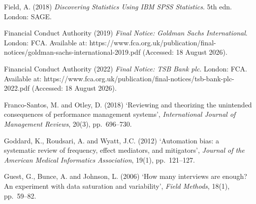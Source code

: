 \documentclass[11pt,a4paper]{article}
\numberwithin{figure}{section}
\numberwithin{table}{section}
\begin{document}
{\noindent\hypertarget{ref25}{}\begin{minipage}[t]{\dimexpr\linewidth-1.05cm\relax}Field, A. (2018) \emph{Discovering Statistics Using IBM SPSS Statistics}. 5th edn. London: SAGE.\end{minipage}\par\vspace{4pt}
\noindent\hypertarget{ref26}{}\begin{minipage}[t]{\dimexpr\linewidth-1.05cm\relax}Financial Conduct Authority (2019) \emph{Final Notice: Goldman Sachs International}. London: FCA. Available at: https://www.fca.org.uk/publication/final-notices/goldman-sachs-international-2019.pdf (Accessed: 18 August 2026).\end{minipage}\par\vspace{4pt}
\noindent\hypertarget{ref27}{}\begin{minipage}[t]{\dimexpr\linewidth-1.05cm\relax}Financial Conduct Authority (2022) \emph{Final Notice: TSB Bank plc}. London: FCA. Available at: https://www.fca.org.uk/publication/final-notices/tsb-bank-plc-2022.pdf (Accessed: 18 August 2026).\end{minipage}\par\vspace{4pt}
\noindent\hypertarget{ref28}{}\begin{minipage}[t]{\dimexpr\linewidth-1.05cm\relax}Franco-Santos, M. and Otley, D. (2018) `Reviewing and theorizing the unintended consequences of performance management systems', \emph{International Journal of Management Reviews}, 20(3), pp.~696--730.\end{minipage}\par\vspace{4pt}
\noindent\hypertarget{ref29}{}\begin{minipage}[t]{\dimexpr\linewidth-1.05cm\relax}Goddard, K., Roudsari, A. and Wyatt, J.C. (2012) `Automation bias: a systematic review of frequency, effect mediators, and mitigators', \emph{Journal of the American Medical Informatics Association}, 19(1), pp.~121--127.\end{minipage}\par\vspace{4pt}
\noindent\hypertarget{ref30}{}\begin{minipage}[t]{\dimexpr\linewidth-1.05cm\relax}Guest, G., Bunce, A. and Johnson, L. (2006) `How many interviews are enough? An experiment with data saturation and variability', \emph{Field Methods}, 18(1), pp.~59--82.\end{minipage}\par\vspace{4pt}
}
\end{document}
